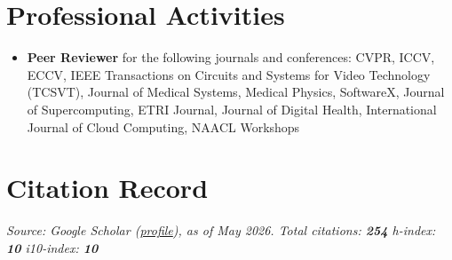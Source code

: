 \documentclass[letterpaper,11pt]{article}
\begin{document}

\section{Professional Activities}
\begin{itemize}[leftmargin=1cm, label={}, topsep=0pt, itemsep=0pt]
  \small
  \item \textbf{Peer Reviewer} for the following journals and conferences: CVPR, ICCV, ECCV, IEEE Transactions on Circuits and Systems for Video Technology (TCSVT), Journal of Medical Systems, Medical Physics, SoftwareX, Journal of Supercomputing, ETRI Journal, Journal of Digital Health, International Journal of Cloud Computing, NAACL Workshops
\end{itemize}

\section{Citation Record}

\noindent\small\textit{Source: Google Scholar (\href{https://scholar.google.com/citations?user=4JbL29YAAAAJ}{profile}), as of May 2026. \quad Total citations: \textbf{254} \quad h-index: \textbf{10} \quad i10-index: \textbf{10}}
\vspace{4pt}
\end{document}
